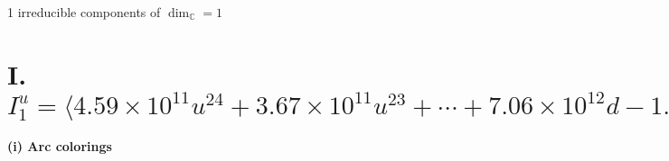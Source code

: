 \documentclass[1p]{elsarticle_modified}
\theoremstyle{definition}
\begin{document}
\raggedright * 1 irreducible components of $\dim_{\mathbb{C}}=1$ \\
\newpage
\renewcommand{\arraystretch}{1}
\centering \section*{I. $I^u_{1}= \langle 4.59\times10^{11} u^{24}+3.67\times10^{11} u^{23}+\cdots+7.06\times10^{12} d-1.24\times10^{12},\;1.48\times10^{11} u^{24}-3.35\times10^{11} u^{23}+\cdots+2.82\times10^{13} c-3.56\times10^{13},\;1.28\times10^{12} u^{24}+2.00\times10^{12} u^{23}+\cdots+1.41\times10^{13} b-1.04\times10^{13},\;3.78\times10^{11} u^{24}+8.96\times10^{11} u^{23}+\cdots+2.82\times10^{13} a-1.49\times10^{13},\;u^{25}+2 u^{24}+\cdots-16 u-8 \rangle$}
\flushleft \textbf{(i) Arc colorings}\\
\end{document}
